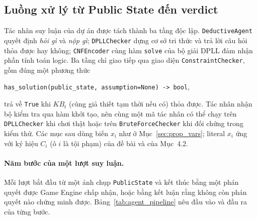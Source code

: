 \subsection{Luồng xử lý từ Public State đến verdict}
\label{sec:agent_pipeline}
\begin{sloppypar}

Tác nhân suy luận của dự án được tách thành ba tầng độc lập.
\texttt{DeductiveAgent} quyết định \emph{hỏi gì} và \emph{nộp gì};
\texttt{DPLLChecker} dựng cơ sở tri thức và trả lời câu hỏi thỏa được hay
không; \texttt{CNFEncoder} cùng hàm \texttt{solve} của bộ giải DPLL đảm nhận
phần tính toán logic. Ba tầng chỉ giao tiếp qua giao diện
\texttt{ConstraintChecker}, gồm đúng một phương thức
\begin{center}
  \texttt{has\_solution(public\_state, assumption=None) -> bool},
\end{center}
trả về \texttt{True} khi $\mathit{KB}_t$ (cùng giả thiết tạm thời nếu có) thỏa
được. Tác nhân nhận bộ kiểm tra qua hàm khởi tạo, nên cùng một mã tác nhân có
thể chạy trên \texttt{DPLLChecker} khi chơi thật hoặc trên
\texttt{BruteForceChecker} khi đối chứng trong kiểm thử. Các mục sau dùng biến
$x_i$ như ở Mục~\ref{sec:prop_vars}; literal $x_i$ ứng với ký hiệu $C_i$ (ô $i$
là tội phạm) của đề bài và của Mục~4.2.

\paragraph{Năm bước của một lượt suy luận.}
Mỗi lượt bắt đầu từ một ảnh chụp \texttt{PublicState} và kết thúc bằng một
phán quyết được Game Engine chấp nhận, hoặc bằng kết luận rằng không còn phán
quyết nào chứng minh được. Bảng~\ref{tab:agent_pipeline} nêu đầu vào và đầu
ra của từng bước.


\end{sloppypar}
